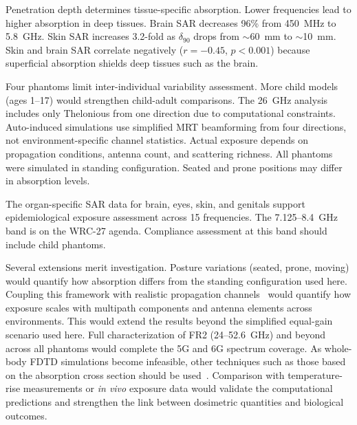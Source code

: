 \documentclass{iopjournal}
\begin{document}
Penetration depth determines tissue-specific absorption.
Lower frequencies lead to higher absorption in deep tissues.
Brain \gls{SAR} decreases 96\% from 450~MHz to 5.8~GHz. Skin \gls{SAR} increases 3.2-fold as $\delta_{90}$ drops from $\sim$60~mm to $\sim$10~mm.
Skin and brain \gls{SAR} correlate negatively ($r = -0.45$, $p < 0.001$) because superficial absorption shields deep tissues such as the brain.

Four phantoms limit inter-individual variability assessment.
More child models (ages 1--17) would strengthen child-adult comparisons.
The 26~GHz analysis includes only Thelonious from one direction due to computational constraints.
Auto-induced simulations use simplified \gls{MRT} beamforming from four directions, not environment-specific channel statistics.
Actual exposure depends on propagation conditions, antenna count, and scattering richness.
All phantoms were simulated in standing configuration. Seated and prone positions may differ in absorption levels.

The organ-specific \gls{SAR} data for brain, eyes, skin, and genitals support epidemiological exposure assessment across 15 frequencies.
The 7.125--8.4~GHz band is on the WRC-27 agenda.
Compliance assessment at this band should include child phantoms.

Several extensions merit investigation.
Posture variations (seated, prone, moving) would quantify how absorption differs from the standing configuration used here.
Coupling this framework with realistic propagation channels~\citep{shikhantsov2020massive,wydaeghe2022realistic,wydaeghe2025outdoor} would quantify how exposure scales with multipath components and antenna elements across environments. This would extend the results beyond the simplified equal-gain scenario used here.
Full characterization of FR2 (24--52.6~GHz) and beyond across all phantoms would complete the 5G and 6G spectrum coverage. As whole-body FDTD simulations become infeasible, other techniques such as those based on the absorption cross section should be used~\cite{kodera2024wbasar}.
Comparison with temperature-rise measurements or \emph{in vivo} exposure data would validate the computational predictions and strengthen the link between dosimetric quantities and biological outcomes.

\end{document}
